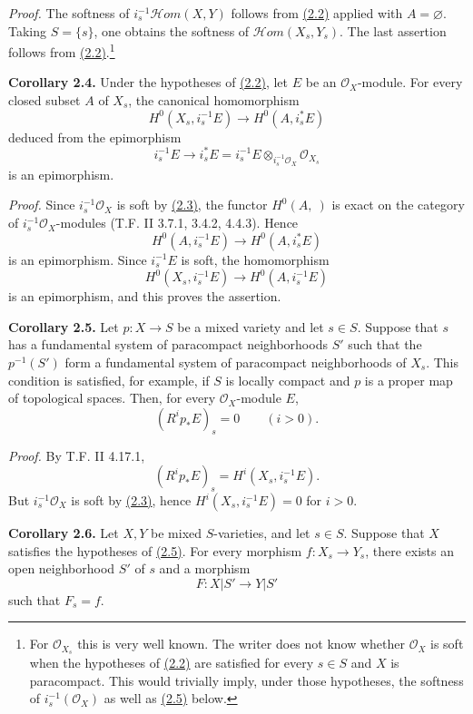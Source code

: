 \emph{Proof.} The softness of $i_s^{-1}\mathcal Hom(X,Y)$ follows from \hyperlink{sga6.e02.prop.2-2}{(2.2)} applied with $A=\varnothing$. Taking $S=\{s\}$, one obtains the softness of $\mathcal Hom(X_s,Y_s)$. The last assertion follows from \hyperlink{sga6.e02.prop.2-2}{(2.2)}.\footnote{For $\mathcal O_{X_s}$ this is very well known. The writer does not know whether $\mathcal O_X$ is soft when the hypotheses of \hyperlink{sga6.e02.prop.2-2}{(2.2)} are satisfied for every $s\in S$ and $X$ is paracompact. This would trivially imply, under those hypotheses, the softness of $i_s^{-1}(\mathcal O_X)$ as well as \hyperlink{sga6.e02.cor.2-5}{(2.5)} below.}

\textbf{Corollary 2.4.} Under the hypotheses of \hyperlink{sga6.e02.prop.2-2}{(2.2)}, let $E$ be an $\mathcal O_X$-module. For every closed subset $A$ of $X_s$, the canonical homomorphism
\[
 H^0(X_s,i_s^{-1}E)\longrightarrow H^0(A,i_s^*E)
\]
deduced from the epimorphism
\[
 i_s^{-1}E\longrightarrow i_s^*E=i_s^{-1}E\otimes_{i_s^{-1}\mathcal O_X}\mathcal O_{X_s}
\]
is an epimorphism.

\emph{Proof.} Since $i_s^{-1}\mathcal O_X$ is soft by \hyperlink{sga6.e02.cor.2-3}{(2.3)}, the functor $H^0(A,\ )$ is exact on the category of $i_s^{-1}\mathcal O_X$-modules (T.F. II 3.7.1, 3.4.2, 4.4.3). Hence
\[
 H^0(A,i_s^{-1}E)\longrightarrow H^0(A,i_s^*E)
\]
is an epimorphism. Since $i_s^{-1}E$ is soft, the homomorphism
\[
 H^0(X_s,i_s^{-1}E)\longrightarrow H^0(A,i_s^{-1}E)
\]
is an epimorphism, and this proves the assertion.

\textbf{Corollary 2.5.} Let $p:X\to S$ be a mixed variety and let $s\in S$. Suppose that $s$ has a fundamental system of paracompact neighborhoods $S'$ such that the $p^{-1}(S')$ form a fundamental system of paracompact neighborhoods of $X_s$. This condition is satisfied, for example, if $S$ is locally compact and $p$ is a proper map of topological spaces. Then, for every $\mathcal O_X$-module $E$,
\[
 (R^ip_*E)_s=0\qquad(i>0).
\]

\emph{Proof.} By T.F. II 4.17.1,
\[
 (R^ip_*E)_s=H^i(X_s,i_s^{-1}E).
\]
But $i_s^{-1}\mathcal O_X$ is soft by \hyperlink{sga6.e02.cor.2-3}{(2.3)}, hence $H^i(X_s,i_s^{-1}E)=0$ for $i>0$.

\textbf{Corollary 2.6.} Let $X,Y$ be mixed $S$-varieties, and let $s\in S$. Suppose that $X$ satisfies the hypotheses of \hyperlink{sga6.e02.cor.2-5}{(2.5)}. For every morphism $f:X_s\to Y_s$, there exists an open neighborhood $S'$ of $s$ and a morphism
\[
 F:X|S'\longrightarrow Y|S'
\]
such that $F_s=f$.

